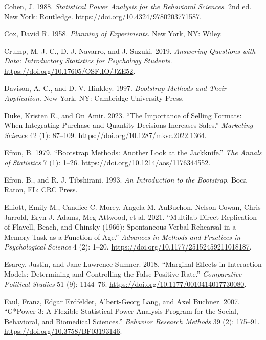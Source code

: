 \documentclass[
  11pt,
  letterpaper,
]{scrbook}
\newlength{\cslhangindent}
\newenvironment{CSLReferences}[2] %
 {\begin{list}{}{%
  \setlength{\itemindent}{0pt}
  \setlength{\leftmargin}{0pt}
  \setlength{\parsep}{0pt}
  \ifodd #1
   \setlength{\leftmargin}{\cslhangindent}
   \setlength{\itemindent}{-1\cslhangindent}
  \fi
  \setlength{\itemsep}{#2\baselineskip}}}
 {\end{list}}
\theoremstyle{definition}
\theoremstyle{definition}
\theoremstyle{remark}
\begin{document}
\begin{CSLReferences}{1}{0}
Cohen, J. 1988. \emph{Statistical Power Analysis for the Behavioral
Sciences}. 2nd ed. New York: Routledge.
\url{https://doi.org/10.4324/9780203771587}.

Cox, David R. 1958. \emph{Planning of Experiments}. New York, NY: Wiley.

Crump, M. J. C., D. J. Navarro, and J. Suzuki. 2019. \emph{Answering
Questions with Data: Introductory Statistics for Psychology Students}.
\url{https://doi.org/10.17605/OSF.IO/JZE52}.

Davison, A. C., and D. V. Hinkley. 1997. \emph{Bootstrap Methods and
Their Application}. New York, NY: Cambridge University Press.

Duke, Kristen E., and On Amir. 2023. {``The Importance of Selling
Formats: When Integrating Purchase and Quantity Decisions Increases
Sales.''} \emph{Marketing Science} 42 (1): 87--109.
\url{https://doi.org/10.1287/mksc.2022.1364}.

Efron, B. 1979. {``Bootstrap Methods: Another Look at the Jackknife.''}
\emph{The Annals of Statistics} 7 (1): 1--26.
\url{https://doi.org/10.1214/aos/1176344552}.

Efron, B., and R. J. Tibshirani. 1993. \emph{An Introduction to the
Bootstrap}. Boca Raton, FL: CRC Press.

Elliott, Emily M., Candice C. Morey, Angela M. AuBuchon, Nelson Cowan,
Chris Jarrold, Eryn J. Adams, Meg Attwood, et al. 2021. {``Multilab
Direct Replication of {F}lavell, {B}each, and {C}hinsky (1966):
Spontaneous Verbal Rehearsal in a Memory Task as a Function of Age.''}
\emph{Advances in Methods and Practices in Psychological Science} 4 (2):
1--20. \url{https://doi.org/10.1177/25152459211018187}.

Esarey, Justin, and Jane Lawrence Sumner. 2018. {``Marginal Effects in
Interaction Models: Determining and Controlling the False Positive
Rate.''} \emph{Comparative Political Studies} 51 (9): 1144--76.
\url{https://doi.org/10.1177/0010414017730080}.

Faul, Franz, Edgar Erdfelder, Albert-Georg Lang, and Axel Buchner. 2007.
{``{G*Power 3}: A Flexible Statistical Power Analysis Program for the
Social, Behavioral, and Biomedical Sciences.''} \emph{Behavior Research
Methods} 39 (2): 175--91. \url{https://doi.org/10.3758/BF03193146}.


\end{CSLReferences}
\end{document}
